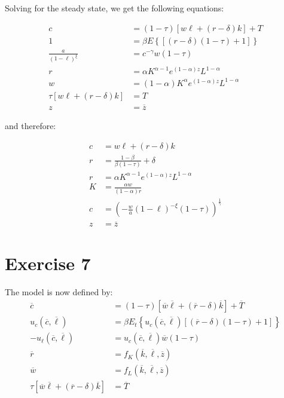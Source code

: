 \documentclass[11pt]{article}
\numberwithin{equation}{section}
\theoremstyle{plain}
\theoremstyle{definition}
\newcommand\parens[1]{\left( #1 \right)}
\newcommand{\1}{\mathbbm 1}
\def\a{\alpha}
\def\b{\beta}
\def\g{\gamma}
\def\d{\delta}
\def\t{\tau}
\begin{document}
Solving for the steady state, we get the following equations:

\begin{align}
c&=(1-\tau)\left[w \ell+\left(r-\delta\right) k\right]+T \\
1&=\beta E\left\{\left[\left(r-\delta\right)(1-\tau)+1\right]\right\} \\
\frac{a}{(1-\ell)^{\xi}}&=c^{-\g} w(1-\tau) \\
r&=\a K^{\alpha - 1} e^{(1-\alpha)z}L^{1-\a}\\
w&=(1-\a)K^{\alpha} e^{(1- \alpha) z}L^{1-\a} \\
\tau\left[w \ell+\left(r-\delta\right) k\right]&=T\\
z&=\overline{z}
\end{align}


and therefore:

\begin{align}
c&=w \ell+ (r-\delta) k \\
r&= \frac{1-\b}{\b (1 - \t)} + \d \\
r&=\a K^{\alpha - 1} e^{(1-\alpha)z}L^{1-\a}\\
K &= \frac{\a w}{(1-\a)r}\\
c &= \parens{-\frac{w}{a}(1-\ell)^{-\xi}(1-\tau)}^{\frac{1}{\g}}\\
z &=\overline{z}
\end{align}


\section*{Exercise 7}
The model is now defined by:
\begin{align*}
\overline{c}&=(1-\tau)[\overline{w} \overline{\ell}+(\overline{r}-\delta) \overline{k}]+\overline{T} \\ 
u_{c}(\overline{c}, \overline{\ell})&=\beta E_{t}\left\{u_{c}(\overline{c}, \overline{\ell})[(\overline{r}-\delta)(1-\tau)+1]\right\} \\ 
-u_{\ell}(\overline{c}, \overline{\ell})&=u_{c}(\overline{c}, \overline{\ell}) \overline{w}(1-\tau) \\ 
\overline{r}&=f_{K}(\overline{k}, \overline{\ell}, \overline{z}) \\ 
\overline{w}&=f_{L}(\overline{k}, \overline{\ell}, \overline{z}) \\ 
\tau[\overline{w} \overline{\ell}+(\overline{r}-\delta) \overline{k}]&=\overline{T}
\end{align*}




\end{document}
